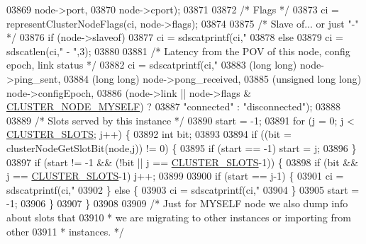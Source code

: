 \begin{DoxyCode}
{{{{{{{{{{{{{{{{{{{{{{{{{{{{{{{{{{{{{{{{{{{{{{{{{{{{{{{{{{{{{{{{{03869         node->port,
03870         node->cport);
03871 
03872     \textcolor{comment}{/* Flags */}
03873     ci = representClusterNodeFlags(ci, node->flags);
03874 
03875     \textcolor{comment}{/* Slave of... or just "-" */}
03876     \textcolor{keywordflow}{if} (node->slaveof)
03877         ci = sdscatprintf(ci,\textcolor{stringliteral}{" %
03878     \textcolor{keywordflow}{else}
03879         ci = sdscatlen(ci,\textcolor{stringliteral}{" - "},3);
03880 
03881     \textcolor{comment}{/* Latency from the POV of this node, config epoch, link status */}
03882     ci = sdscatprintf(ci,\textcolor{stringliteral}{"%
03883         (\textcolor{keywordtype}{long} \textcolor{keywordtype}{long}) node->ping\_sent,
03884         (\textcolor{keywordtype}{long} \textcolor{keywordtype}{long}) node->pong\_received,
03885         (\textcolor{keywordtype}{unsigned} \textcolor{keywordtype}{long} \textcolor{keywordtype}{long}) node->configEpoch,
03886         (node->link || node->flags & \hyperlink{cluster_8h_afee946c4e74c08465e9b4ead5e3659e6}{CLUSTER\_NODE\_MYSELF}) ?
03887                     \textcolor{stringliteral}{"connected"} : \textcolor{stringliteral}{"disconnected"});
03888 
03889     \textcolor{comment}{/* Slots served by this instance */}
03890     start = -1;
03891     \textcolor{keywordflow}{for} (j = 0; j < \hyperlink{cluster_8h_aa3e2cb951eebb16725ecc3f5beefd9fd}{CLUSTER\_SLOTS}; j++) \{
03892         \textcolor{keywordtype}{int} bit;
03893 
03894         \textcolor{keywordflow}{if} ((bit = clusterNodeGetSlotBit(node,j)) != 0) \{
03895             \textcolor{keywordflow}{if} (start == -1) start = j;
03896         \}
03897         \textcolor{keywordflow}{if} (start != -1 && (!bit || j == \hyperlink{cluster_8h_aa3e2cb951eebb16725ecc3f5beefd9fd}{CLUSTER\_SLOTS}-1)) \{
03898             \textcolor{keywordflow}{if} (bit && j == \hyperlink{cluster_8h_aa3e2cb951eebb16725ecc3f5beefd9fd}{CLUSTER\_SLOTS}-1) j++;
03899 
03900             \textcolor{keywordflow}{if} (start == j-1) \{
03901                 ci = sdscatprintf(ci,\textcolor{stringliteral}{" %
03902             \} \textcolor{keywordflow}{else} \{
03903                 ci = sdscatprintf(ci,\textcolor{stringliteral}{" %
03904             \}
03905             start = -1;
03906         \}
03907     \}
03908 
03909     \textcolor{comment}{/* Just for MYSELF node we also dump info about slots that}
03910 \textcolor{comment}{     * we are migrating to other instances or importing from other}
03911 \textcolor{comment}{     * instances. */}
}}}}}}}}}}}}}}}}}}}}}}}}}}}}}}}}}}}}}}}}}}}}}}}}}}}}}}}}}}}}}}}}}}}}}
\end{DoxyCode}
